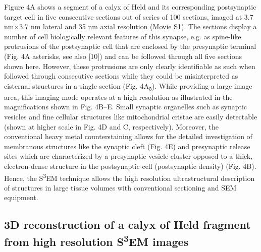 \documentclass{article}
\begin{document}
Figure 4A shows a segment of a calyx of Held and its corresponding postsynaptic target cell in five consecutive sections out of series of 100 sections, imaged at 3.7 nm×3.7 nm lateral and 35 nm axial resolution (Movie S1). The sections display a number of cell biologically relevant features of this synapse, e.g. as spine-like protrusions of the postsynaptic cell that are enclosed by the presynaptic terminal (Fig. 4A asterisks, see also [10]) and can be followed through all five sections shown here. However, these protrusions are only clearly identifiable as such when followed through consecutive sections while they could be misinterpreted as cisternal structures in a single section (Fig. 4A\textsubscript{5}). While providing a large image area, this imaging mode operates at a high resolution as illustrated in the magnifications shown in Fig. 4B–E. Small synaptic organelles such as synaptic vesicles and fine cellular structures like mitochondrial cristae are easily detectable (shown at higher scale in Fig. 4D and C, respectively). Moreover, the conventional heavy metal counterstaining allows for the detailed investigation of membranous structures like the synaptic cleft (Fig. 4E) and presynaptic release sites which are characterized by a presynaptic vesicle cluster opposed to a thick, electron-dense structure in the postsynaptic cell (postsynaptic density) (Fig. 4B). Hence, the S\textsuperscript{3}EM technique allows the high resolution ultrastructural description of structures in large tissue volumes with conventional sectioning and SEM equipment.

\subsection*{3D reconstruction of a calyx of Held fragment from high resolution S\textsuperscript{3}EM images}
\end{document}
